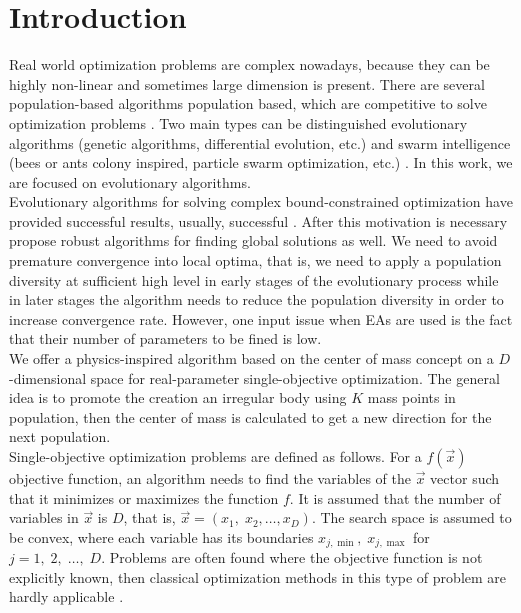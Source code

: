 \documentclass[graybox]{svmult}
\begin{document}
\section{Introduction}
Real world optimization problems  are complex nowadays, because they can be highly 
non-linear and sometimes large dimension is present. There are several population-based 
algorithms population based, which are competitive to solve optimization problems \cite{easSurv}.  
Two main  types can be distinguished  evolutionary algorithms (genetic algorithms, 
differential evolution, etc.) \cite{jso2017, melanie96, ed1995} and swarm 
intelligence (bees or ants colony inspired, particle swarm optimization, etc.) 
\cite{abc2005,pso1995}. In this work, we are focused on evolutionary algorithms.\\

Evolutionary algorithms for solving complex bound-constrained optimization have 
provided successful results, usually, successful \cite{ed1995}. After this motivation
is necessary propose robust algorithms for finding global solutions as well. We
need to avoid premature convergence into local optima, that is, we need to apply
a population diversity at sufficient high level in early stages of the evolutionary
process while in later stages the algorithm needs to reduce the population 
diversity in order to increase convergence rate. However, one input issue when EAs 
are used is the fact that their number of parameters to be fined is low.
\\

We offer a  physics-inspired algorithm based on the center of mass concept on a 
$D$-dimensional space for  real-parameter single-objective optimization. The general 
idea is to promote the creation an irregular body using $K$ mass points in population, 
then the center of mass is calculated to get a new direction for the next population.\\

Single-objective optimization problems are defined as follows. For a $f(\vec{x})$ 
objective function, an algorithm needs to find the variables of the $\vec{x}$ vector
such that it minimizes or maximizes the function $f$. It is assumed that the number 
of variables in $\vec{x}$ is $D$, that is, $\vec{x} = (x_1,\; x_2 , \ldots , x_D )$. 
The search space is assumed to be convex, where each variable has its  boundaries 
$x_{j, \min}, \;  x_{j, \max} $ for $j = 1,\; 2,\; \ldots,\; D$. Problems are often 
found where the objective function is not explicitly known, then classical optimization 
methods in this type of problem are hardly applicable \cite{problemas}.\\
\end{document}
